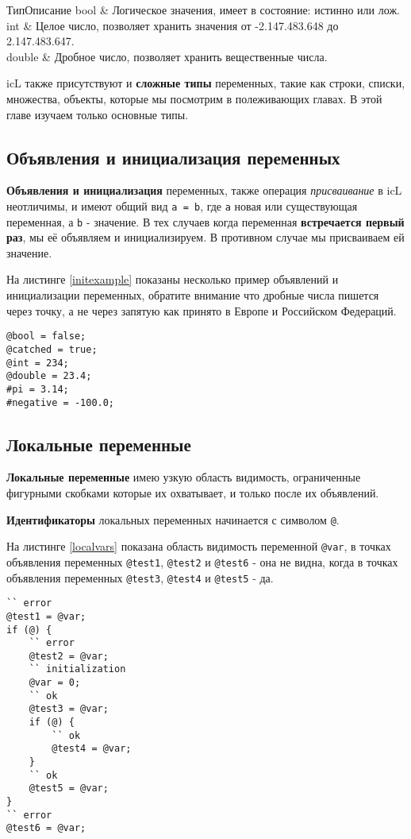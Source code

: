 \documentclass[a4paper, 14pt]{extarticle}
\begin{document}
%
{Тип}{Описание}%
{
	bool   & Логическое значения, имеет в состояние: истинно или лож. 					 \\ \hline
	int    & Целое число, позволяет хранить значения от -2.147.483.648 до 2.147.483.647. \\ \hline
	double & Дробное число, позволяет хранить вещественные числа. 						 \\
}

icL также присутствуют и \textbf{сложные типы} переменных, такие как строки, списки, множества, объекты, которые мы посмотрим в полеживающих главах. В этой главе изучаем только основные типы.

\subsection{Объявления и инициализация переменных}

\textbf{Объявления и инициализация} переменных, также операция \textit{присваивание} в icL неотличимы, и имеют общий вид \lstinline`a = b`, где \lstinline`a` новая или существующая переменная, а \lstinline`b` - значение. В тех случаев когда переменная \textbf{встречается первый раз}, мы её объявляем и инициализируем. В противном случае мы присваиваем ей значение.

На листинге \ref{initexample} показаны несколько пример объявлений и инициализации переменных, обратите внимание что дробные числа пишется через точку, а не через запятую как принято в Европе и Российском Федераций.

\begin{lstlisting}[caption=Пример объявлений и инициализации переменных,label=initexample]
@bool = false;
@catched = true;
@int = 234;
@double = 23.4;
#pi = 3.14;
#negative = -100.0;
\end{lstlisting}

\subsection{Локальные переменные}

\textbf{Локальные переменные} имею узкую область видимость, ограниченные фигурными скобками которые их охватывает, и только после их объявлений.

{\bf Идентификаторы} локальных переменных начинается с символом \lstinline`@`.

На листинге \ref{localvars} показана область видимость переменной \lstinline`@var`, в точках объявления переменных \lstinline`@test1`, \lstinline`@test2` и \lstinline`@test6` - она не видна, когда в точках объявления переменных \lstinline`@test3`, \lstinline`@test4` и \lstinline`@test5` - да.
\begin{lstlisting}[caption=Область видимости локальных перемен, label=localvars]
`` error
@test1 = @var;
if (@) {
	`` error
	@test2 = @var;
	`` initialization
	@var = 0;
	`` ok
	@test3 = @var;
	if (@) {
		`` ok
		@test4 = @var;
	}
	`` ok
	@test5 = @var;
}
`` error
@test6 = @var;
\end{lstlisting}
\end{document}
